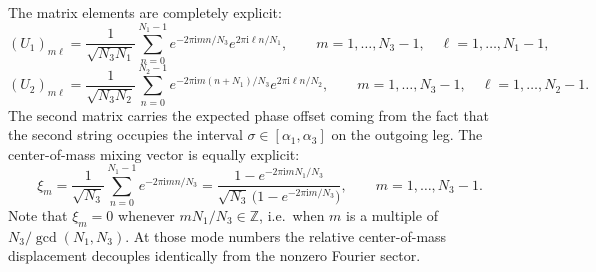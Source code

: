 \documentclass[11pt]{article}
\numberwithin{equation}{section}
\newcommand{\ZZ}{\mathbb{Z}}
\newcommand{\ii}{\mathrm{i}}
\begin{document}
The matrix elements are completely explicit:
\begin{equation}
\label{eq:s10-015}
(U_1)_{m\ell}
=
\frac{1}{\sqrt{N_3 N_1}}
\sum_{n=0}^{N_1-1}
e^{-2\pi \ii mn/N_3} e^{2\pi \ii \ell n/N_1},
\qquad
m=1,\dots,N_3-1,\quad \ell=1,\dots,N_1-1,
\end{equation}
\begin{equation}
\label{eq:s10-016}
(U_2)_{m\ell}
=
\frac{1}{\sqrt{N_3 N_2}}
\sum_{n=0}^{N_2-1}
e^{-2\pi \ii m(n+N_1)/N_3} e^{2\pi \ii \ell n/N_2},
\qquad
m=1,\dots,N_3-1,\quad \ell=1,\dots,N_2-1.
\end{equation}
The second matrix carries the expected phase offset coming from the fact that the second string occupies the interval $\sigma\in[\alpha_1,\alpha_3]$ on the outgoing leg. The center-of-mass mixing vector is equally explicit:
\begin{equation}
\label{eq:s10-017}
\xi_m
=
\frac{1}{\sqrt{N_3}}
\sum_{n=0}^{N_1-1}
e^{-2\pi \ii mn/N_3}
=
\frac{1-e^{-2\pi \ii m N_1/N_3}}{\sqrt{N_3}\,\bigl(1-e^{-2\pi \ii m/N_3}\bigr)},
\qquad
m=1,\dots,N_3-1.
\end{equation}
Note that $\xi_m=0$ whenever $mN_1/N_3\in\ZZ$, i.e.\ when $m$ is a multiple of $N_3/\gcd(N_1,N_3)$. At those mode numbers the relative center-of-mass displacement decouples identically from the nonzero Fourier sector.
\end{document}
